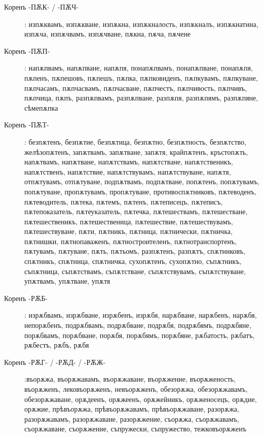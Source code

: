 \documentclass{article}
\begin{document}
\begin{description}
	\item[Коренъ -ПѪК- / -ПѪЧ-]: изпѫквамъ, изпѫкване, изпѫкна, изпѫкналость, изпѫкналъ, изпѫкнатина, изпѫча, изпѫчвамъ, изпѫчване, пѫкна, пѫча, пѫчене
	
	\item[Коренъ -ПѪП-]: напѫпвамъ, напѫпване, напѫпя, понапѫпвамъ, понапѫпване, понапѫпя, пѫпенъ, пѫпешовъ, пѫпешъ, пѫпка, пѫпковиденъ, пѫпкувамъ, пѫпкуване, пѫпчасамъ, пѫпчасвамъ, пѫпчасване, пѫпчестъ, пѫпчивость, пѫпчивъ, пѫпчица, пѫпъ, разпѫпвамъ, разпѫпване, разпѫпя, разпѫпямъ, разпѫпяне, сѣмепѫпка
	
	\item[Коренъ -ПѪТ-]: безпѫтенъ, безпѫтие, безпѫтица, безпѫтно, безпѫтность, безпѫтство, желѣзопѫтенъ, запѫтвамъ, запѫтване, запѫтя, крайпѫтенъ, кръстопѫть, напѫтвамъ, напѫтване, напѫтствамъ, напѫтстване, напѫтственикъ, напѫтственъ, напѫтствие, напѫтствувамъ, напѫтствуване, напѫтя, отпѫтувамъ, отпѫтуване, подпѫтвамъ, подпѫтване, попѫтенъ, попѫтувамъ, попѫтуване, пропѫтувамъ, пропѫтуване, противоспѫтниковъ, пѫтеводенъ, пѫтеводитель, пѫтека, пѫтемъ, пѫтенъ, пѫтеписецъ, пѫтеписъ, пѫтепоказатель, пѫтеуказатель, пѫтечка, пѫтешествамъ, пѫтешестване, пѫтешественикъ, пѫтешественица, пѫтешествие, пѫтешествувамъ, пѫтешествуване, пѫти, пѫтникъ, пѫтница, пѫтнически, пѫтничка, пѫтнишки, пѫтнопаваженъ, пѫтностроителенъ, пѫтнотранспортенъ, пѫтувамъ, пѫтуване, пѫть, пѫтьомъ, разпѫтенъ, разпѫтъ, спѫтниковъ, спѫтникъ, спѫтница, спѫтничка, сухопѫтенъ, сухопѫтно, съпѫтникъ, съпѫтница, съпѫтствамъ, съпѫтстване, съпѫтствувамъ, съпѫтствуване, упѫтвамъ, упѫтване, упѫтя
	
	\item[Коренъ -РѪБ-]: изрѫбвамъ, изрѫбване, изрѫбенъ, изрѫбя, нарѫбване, нарѫбенъ, нарѫбя, непорѫбенъ, подрѫбвамъ, подрѫбване, подрѫбя, подрѫбямъ, подрѫбяне, порѫбвамъ, порѫбване, порѫбя, порѫбямъ, порѫбяне, рѫбатость, рѫбатъ, рѫбестъ, рѫбъ, рѫбя
	
	\item[Коренъ -РѪГ- / -РѪД- / -РѪЖ-]:въорѫжа, въорѫжавамъ, въорѫжаване, въорѫжение, въорѫженость, въорѫженъ, лековъорѫженъ, невъорѫженъ, обезорѫжа, обезорѫжавамъ, обезорѫжаване, орѫдеенъ, орѫжеенъ, орѫжейникъ, орѫженосецъ, орѫдие, орѫжие, прѣвъорѫжа, прѣвъорѫжавамъ, прѣвъорѫжаване, разорѫжа, разорѫжавамъ, разорѫжаване, разорѫжение, съорѫжа, съорѫжавамъ, съорѫжаване, съорѫжение, съпружески, съпружество, тежковъорѫженъ %
	

\end{description}
\end{document}
